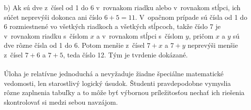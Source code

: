 {b) Ak sú dve z~čísel od 1 do 6 v~rovnakom riadku alebo v~rovnakom stĺpci, ich súčet neprevýši dokonca ani číslo $6 + 5 = 11$. V~opačnom prípade sú čísla od 1 do 6 rozmiestnené vo všetkých riadkoch a všetkých stĺpcoch, takže číslo 7 je v~rovnakom riadku s~číslom $x$ a v~rovnakom stĺpci s~číslom $y$, pričom $x$ a $y$ sú dve rôzne čísla od 1 do 6. Potom menšie z~čísel $7 + x$ a $7 + y$ neprevýši menšie z~čísel $7 + 6$ a $7 + 5$, teda číslo 12. Tým je tvrdenie dokázané.\\
\\
\kom Úloha je relatívne jednoduchá a nevyžaduje žiadne špeciálne matematické vedomosti, len starostlivý logický úsudok. Študenti pravdepodobne vymyslia rôzne zaplnenia tabuľky a to môže byť výbornou príležitosťou nechať ich riešenia skontrolovať si medzi sebou navzájom. \\
\\
}
